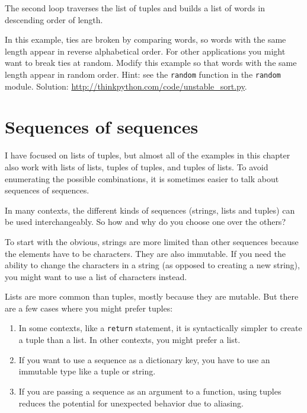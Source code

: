 \documentclass[10pt]{book}
\begin{document}
The second loop traverses the list of tuples and builds a list of
words in descending order of length.

\begin{exercise}

In this example, ties are broken by comparing words, so words
with the same length appear in reverse alphabetical order.  For other
applications you might want to break ties at random.  Modify
this example so that words with the same length appear in
random order.  Hint: see the {\tt random} function in the
{\tt random} module.
Solution: \url{http://thinkpython.com/code/unstable_sort.py}.


\end{exercise}


\section{Sequences of sequences}

I have focused on lists of tuples, but almost all of the examples in
this chapter also work with lists of lists, tuples of tuples, and
tuples of lists.  To avoid enumerating the possible combinations, it
is sometimes easier to talk about sequences of sequences.

In many contexts, the different kinds of sequences (strings, lists and
tuples) can be used interchangeably.  So how and why do you choose one
over the others?

To start with the obvious, strings are more limited than other
sequences because the elements have to be characters.  They are
also immutable.  If you need the ability to change the characters
in a string (as opposed to creating a new string), you might
want to use a list of characters instead.

Lists are more common than tuples, mostly because they are mutable.
But there are a few cases where you might prefer tuples:

\begin{enumerate}

\item In some contexts, like a {\tt return} statement, it is
syntactically simpler to create a tuple than a list.  In other
contexts, you might prefer a list.

\item If you want to use a sequence as a dictionary key, you
have to use an immutable type like a tuple or string.

\item If you are passing a sequence as an argument to a function,
using tuples reduces the potential for unexpected behavior
due to aliasing.

\end{enumerate}
\end{document}
